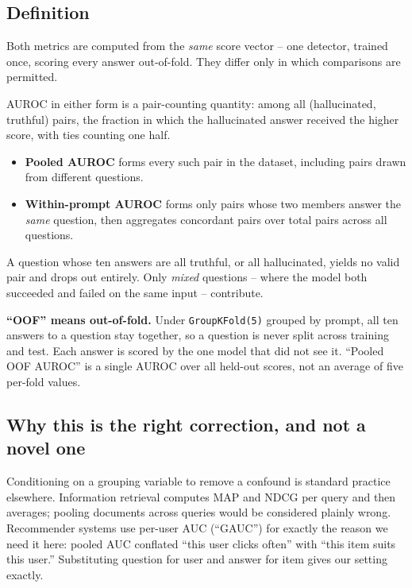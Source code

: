 \documentclass[11pt,a4paper]{article}
\begin{document}
\subsection*{Definition}

Both metrics are computed from the \emph{same} score vector -- one detector, trained once, scoring
every answer out-of-fold. They differ only in which comparisons are permitted.

AUROC in either form is a pair-counting quantity: among all (hallucinated, truthful) pairs, the
fraction in which the hallucinated answer received the higher score, with ties counting one half.

\begin{itemize}
\item \textbf{Pooled AUROC} forms every such pair in the dataset, including pairs drawn from
different questions.
\item \textbf{Within-prompt AUROC} forms only pairs whose two members answer the \emph{same}
question, then aggregates concordant pairs over total pairs across all questions.
\end{itemize}

\noindent A question whose ten answers are all truthful, or all hallucinated, yields no valid pair
and drops out entirely. Only \emph{mixed} questions -- where the model both succeeded and failed
on the same input -- contribute.

\textbf{``OOF'' means out-of-fold.} Under \texttt{GroupKFold(5)} grouped by prompt, all ten answers
to a question stay together, so a question is never split across training and test. Each answer is
scored by the one model that did not see it. ``Pooled OOF AUROC'' is a single AUROC over all
held-out scores, not an average of five per-fold values.

\subsection*{Why this is the right correction, and not a novel one}

Conditioning on a grouping variable to remove a confound is standard practice elsewhere.
Information retrieval computes MAP and NDCG per query and then averages; pooling documents across
queries would be considered plainly wrong. Recommender systems use per-user AUC (``GAUC'') for
exactly the reason we need it here: pooled AUC conflated ``this user clicks often'' with ``this
item suits this user.'' Substituting question for user and answer for item gives our setting
exactly.
\end{document}
